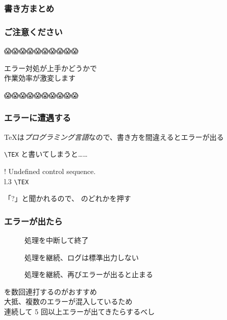 \begin{frame}[fragile]
	\frametitle{書き方まとめ}
	
\end{frame}


\begin{frame}
	\centering\nishikifont
	\frametitle{ご注意ください}
	\centering\LARGE
	😱😱😱😱😱😱😱😱😱😱

	エラー対処が上手かどうかで\\
	作業効率が激変します

	😱😱😱😱😱😱😱😱😱😱
\end{frame}

\begin{frame}[fragile]
	\frametitle{エラーに遭遇する}
	\TeX は\emph{プログラミング言語}なので、書き方を間違えるとエラーが出る

	\verb+\TEX+ と書いてしまうと……

	\pause
	\bgroup\errorfont
	\begin{tabbing}
		! Undefined control sequence.\\
		l.3 \verb+\TEX+\\
	\end{tabbing}
	\egroup
	\pause
	「{\errorfont ?}」と聞かれるので、  \Return のどれかを押す
\end{frame}

\begin{frame}[fragile]
	\frametitle{エラーが出たら}
	\begin{description}
		\item[] 処理を中断して終了
		\item[] 処理を継続、ログは標準出力しない
		\item[\Return] 処理を継続、再びエラーが出ると止まる
	\end{description}

	\Return を数回連打するのがおすすめ\\
	{\footnotesize 大抵、複数のエラーが混入しているため}\\
	連続して 5 回以上エラーが出てきたらするべし
\end{frame}

